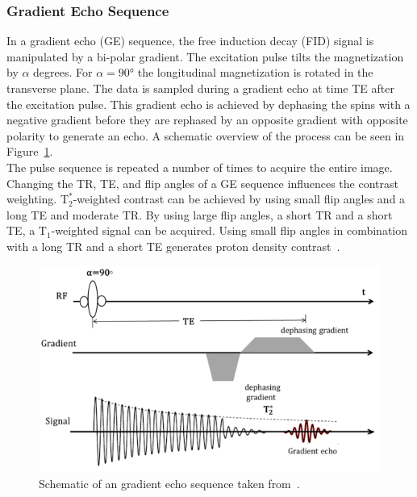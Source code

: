 \subsubsection{Gradient Echo Sequence}
In a gradient echo (GE) sequence, the free induction decay (FID) signal is manipulated by a bi-polar gradient. The excitation pulse tilts the magnetization by $\alpha$ degrees. For $\alpha = 90°$ the longitudinal magnetization is rotated in the transverse plane. The data is sampled during a gradient echo at time TE after the excitation pulse. This gradient echo is achieved by dephasing the spins with a negative gradient before they are rephased by an opposite gradient with opposite polarity to generate an echo. A schematic overview of the process can be seen in Figure~\ref{fig:GradientEcho}. \\
The pulse sequence is repeated a number of times to acquire the entire image. 
Changing the TR, TE, and flip angles of a GE sequence influences the contrast weighting. $\text{T}^*_2$-weighted contrast can be achieved by using small flip angles and a long TE and moderate TR. By using large flip angles, a short TR and a short TE, a $\text{T}_1$-weighted signal can be acquired. Using small flip angles in combination with a long TR and a short TE generates proton density contrast~\cite{PulseSequences}.%

\begin{figure}[htpb]
	\centering
	\graphicspath{{images/}{\main/images/}}
	\includegraphics[width=\linewidth]{GradientEcho.png} 
	\caption{Schematic of an gradient echo sequence taken from~\cite{PulseSequences}.}
	\label{fig:GradientEcho}
\end{figure}

